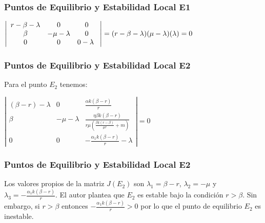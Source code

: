 \documentclass{beamer}
\begin{document}
\begin{frame}
	\frametitle{Puntos de Equilibrio y Estabilidad Local E1}
	\begin{center}
		$\left|\begin{array}{c c c}
				r-\beta-\lambda & 0            & 0 \\
				\beta           & -\mu-\lambda & 0 \\
				0               & 0            & 0-\lambda \
			\end{array} \right|
			=
			(r-\beta-\lambda)(\mu-\lambda)(\lambda) = 0$
	\end{center}
\end{frame}


 \begin{frame}
 	\frametitle{Puntos de Equilibrio y Estabilidad Local E2}
 	\begin{minipage}{10cm}
 		Para el punto $E_2$ tenemos:\\
 		
 			\begin{center}
 				
 			
 				                        $ \left|\begin{array}{ccc}
 					                           (\beta-r)-\lambda & 0            & \frac{\alpha k(\beta-r)}{r}                                                      \\
 					                           \beta             & -\mu-\lambda & \frac{\eta \beta k(\beta-r)}{r \mu\left(\frac{\beta k(r-\beta)}{\mu r}+m\right)} \\
 					                           0                 & 0            & -\frac{\alpha_1 k(\beta-r)}{r} - \lambda
 				                           \end{array}\right|=0$
 		
 		\end{center}
 	\end{minipage}
 \end{frame}


\begin{frame}
	\frametitle{Puntos de Equilibrio y Estabilidad Local E2}
	\begin{minipage}{10cm}
		
		Los valores propios de la matriz $J(E_2)$ son $\lambda_1 = \beta-r$, $\lambda_2=-\mu$ y $\lambda_3=-\frac{\alpha_1 k(\beta-r)}{r}$.
		El autor plantea que $E_2$ es estable bajo la condición $r>\beta$.
		Sin embargo, si $r>\beta$ entonces $-\frac{\alpha_1 k(\beta-r)}{r} > 0$ por lo que el punto de equilibrio $E_2$ es inestable. \par
	\end{minipage}
\end{frame}
\end{document}
